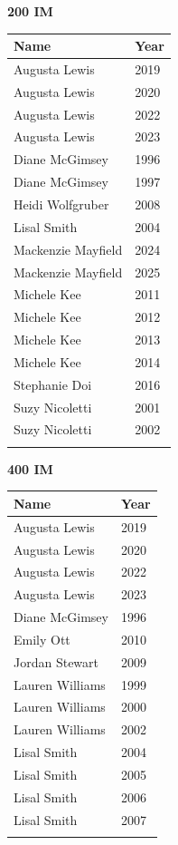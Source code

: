 \hfill
\begin{minipage}[t]{0.48\textwidth}
\centering
\textbf{\textcolor{teamprimary}{200 IM}}\par
\vspace{0.5em}
\centering
\small
\renewcommand{\arraystretch}{1.0}
\setlength{\tabcolsep}{4pt}
\begin{tabular}{@{}p{3.0cm}p{1.0cm}@{}}
\toprule
\textbf{Name} & \textbf{Year} \\
\midrule
Augusta Lewis & 2019 \\
Augusta Lewis & 2020 \\
Augusta Lewis & 2022 \\
Augusta Lewis & 2023 \\
Diane McGimsey & 1996 \\
Diane McGimsey & 1997 \\
Heidi Wolfgruber & 2008 \\
Lisal Smith & 2004 \\
Mackenzie Mayfield & 2024 \\
Mackenzie Mayfield & 2025 \\
Michele Kee & 2011 \\
Michele Kee & 2012 \\
Michele Kee & 2013 \\
Michele Kee & 2014 \\
Stephanie Doi & 2016 \\
Suzy Nicoletti & 2001 \\
Suzy Nicoletti & 2002 \\
\bottomrule
\vspace{0.5em}
\end{tabular}
\end{minipage}
\vspace{1.2em}
\noindent\begin{minipage}[t]{0.48\textwidth}
\centering
\textbf{\textcolor{teamprimary}{400 IM}}\par
\vspace{0.5em}
\centering
\small
\renewcommand{\arraystretch}{1.0}
\setlength{\tabcolsep}{4pt}
\begin{tabular}{@{}p{3.0cm}p{1.0cm}@{}}
\toprule
\textbf{Name} & \textbf{Year} \\
\midrule
Augusta Lewis & 2019 \\
Augusta Lewis & 2020 \\
Augusta Lewis & 2022 \\
Augusta Lewis & 2023 \\
Diane McGimsey & 1996 \\
Emily Ott & 2010 \\
Jordan Stewart & 2009 \\
Lauren Williams & 1999 \\
Lauren Williams & 2000 \\
Lauren Williams & 2002 \\
Lisal Smith & 2004 \\
Lisal Smith & 2005 \\
Lisal Smith & 2006 \\
Lisal Smith & 2007 \\
\bottomrule
\vspace{0.5em}
\end{tabular}
\end{minipage}
